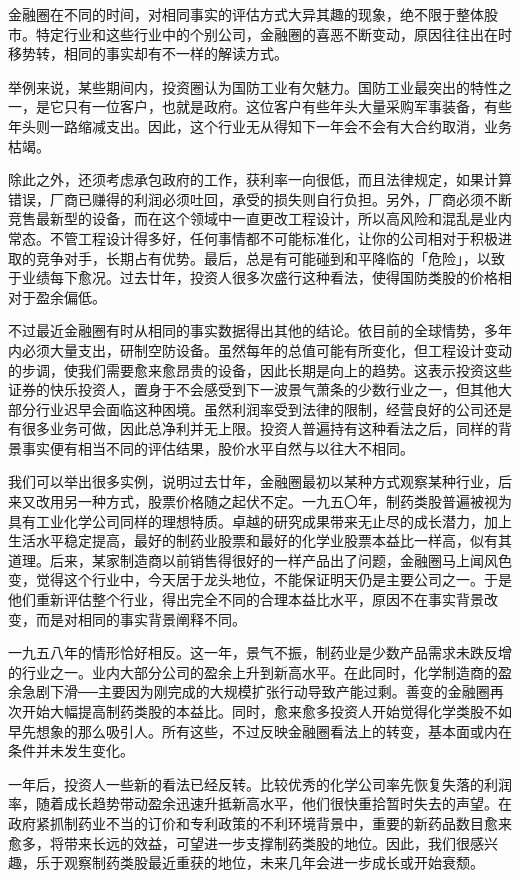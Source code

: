 \documentclass[UTF8,a4paper,zihao=-4,fontset = windows]{ctexart} %
\begin{document}
金融圈在不同的时间，对相同事实的评估方式大异其趣的现象，绝不限于整体股市。特定行业和这些行业中的个别公司，金融圈的喜恶不断变动，原因往往出在时移势转，相同的事实却有不一样的解读方式。

举例来说，某些期间内，投资圈认为国防工业有欠魅力。国防工业最突出的特性之一，是它只有一位客户，也就是政府。这位客户有些年头大量采购军事装备，有些年头则一路缩减支出。因此，这个行业无从得知下一年会不会有大合约取消，业务枯竭。

除此之外，还须考虑承包政府的工作，获利率一向很低，而且法律规定，如果计算错误，厂商已赚得的利润必须吐回，承受的损失则自行负担。另外，厂商必须不断竞售最新型的设备，而在这个领域中一直更改工程设计，所以高风险和混乱是业内常态。不管工程设计得多好，任何事情都不可能标准化，让你的公司相对于积极进取的竞争对手，长期占有优势。最后，总是有可能碰到和平降临的「危险」，以致于业绩每下愈况。过去廿年，投资人很多次盛行这种看法，使得国防类股的价格相对于盈余偏低。

不过最近金融圈有时从相同的事实数据得出其他的结论。依目前的全球情势，多年内必须大量支出，研制空防设备。虽然每年的总值可能有所变化，但工程设计变动的步调，使我们需要愈来愈昂贵的设备，因此长期是向上的趋势。这表示投资这些证券的快乐投资人，置身于不会感受到下一波景气萧条的少数行业之一，但其他大部分行业迟早会面临这种困境。虽然利润率受到法律的限制，经营良好的公司还是有很多业务可做，因此总净利并无上限。投资人普遍持有这种看法之后，同样的背景事实便有相当不同的评估结果，股价水平自然与以往大不相同。

我们可以举出很多实例，说明过去廿年，金融圈最初以某种方式观察某种行业，后来又改用另一种方式，股票价格随之起伏不定。一九五〇年，制药类股普遍被视为具有工业化学公司同样的理想特质。卓越的研究成果带来无止尽的成长潜力，加上生活水平稳定提高，最好的制药业股票和最好的化学业股票本益比一样高，似有其道理。后来，某家制造商以前销售得很好的一样产品出了问题，金融圈马上闻风色变，觉得这个行业中，今天居于龙头地位，不能保证明天仍是主要公司之一。于是他们重新评估整个行业，得出完全不同的合理本益比水平，原因不在事实背景改变，而是对相同的事实背景阐释不同。

一九五八年的情形恰好相反。这一年，景气不振，制药业是少数产品需求未跌反增的行业之一。业内大部分公司的盈余上升到新高水平。在此同时，化学制造商的盈余急剧下滑──主要因为刚完成的大规模扩张行动导致产能过剩。善变的金融圈再次开始大幅提高制药类股的本益比。同时，愈来愈多投资人开始觉得化学类股不如早先想象的那么吸引人。所有这些，不过反映金融圈看法上的转变，基本面或内在条件并未发生变化。

一年后，投资人一些新的看法已经反转。比较优秀的化学公司率先恢复失落的利润率，随着成长趋势带动盈余迅速升抵新高水平，他们很快重拾暂时失去的声望。在政府紧抓制药业不当的订价和专利政策的不利环境背景中，重要的新药品数目愈来愈多，将带来长远的效益，可望进一步支撑制药类股的地位。因此，我们很感兴趣，乐于观察制药类股最近重获的地位，未来几年会进一步成长或开始衰颓。
\end{document}
